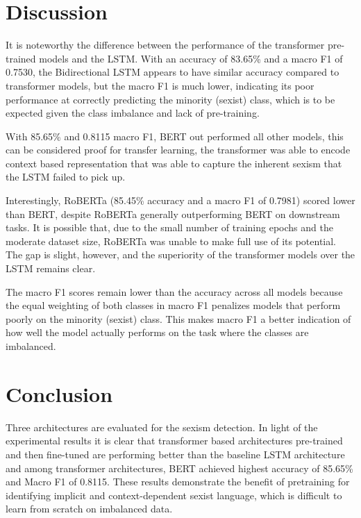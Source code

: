 \documentclass[a4paper,12pt]{report}
\begin{document}
\section{Discussion}

It is noteworthy the difference between the performance of the transformer pre-trained models and the LSTM. With an accuracy of 83.65\% and a macro F1 of 0.7530, the Bidirectional LSTM appears to have similar accuracy compared to transformer models, but the macro F1 is much lower, indicating its poor performance at correctly predicting the minority (sexist) class, which is to be expected given the class imbalance and lack of pre-training.

With 85.65\% and 0.8115 macro F1, BERT out performed all other models, this can be considered proof for transfer learning, the transformer was able to encode context based representation that was able to capture the inherent sexism that the LSTM failed to pick up.

Interestingly, RoBERTa (85.45\% accuracy and a macro F1 of 0.7981) scored lower than BERT, despite RoBERTa generally outperforming BERT on downstream tasks. It is possible that, due to the small number of training epochs and the moderate dataset size, RoBERTa was unable to make full use of its potential. The gap is slight, however, and the superiority of the transformer models over the LSTM remains clear.

The macro F1 scores remain lower than the accuracy across all models because the equal weighting of both classes in macro F1 penalizes models that perform poorly on the minority (sexist) class. This makes macro F1 a better indication of how well the model actually performs on the task where the classes are imbalanced.

\newpage

\section{Conclusion}

Three architectures are evaluated for the sexism detection. In light of the experimental results it is clear that transformer based architectures pre-trained and then fine-tuned are performing better than the baseline LSTM architecture and among transformer architectures, BERT achieved highest accuracy of 85.65\% and Macro F1 of 0.8115. These results demonstrate the benefit of pretraining for identifying implicit and context-dependent sexist language, which is difficult to learn from scratch on imbalanced data.
\end{document}
